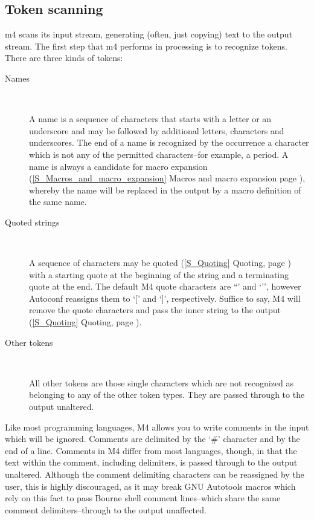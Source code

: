 \subsection{Token scanning}

m4 scans its input stream, generating (often, just copying) text to the output stream. The first step that m4 performs in processing is to recognize tokens. There are three kinds of tokens:

\begin{description}
\item[Names]
\

    A name is a sequence of characters that starts with a letter or an underscore and may be followed by additional letters, characters and underscores. The end of a name is recognized by the occurrence a character which is not any of the permitted characters--for example, a period. A name is always a candidate for macro expansion (\ref{S_Macros_and_macro_expansion} Macros and macro expansion
page \pageref{S_Macros_and_macro_expansion}), whereby the name will be replaced in the output by a macro definition of the same name.

\item[Quoted strings]
\

A sequence of characters may be quoted
(\ref{S_Quoting} Quoting, page \pageref{S_Quoting}) with a starting quote at 
the beginning of the string 
and a terminating quote at the end. The default M4 quote characters 
are ``' and `'', however Autoconf reassigns them to `[' and `]', respectively.
Suffice to say, M4 will remove the quote characters and pass the inner string 
to the output (\ref{S_Quoting} Quoting, page \pageref{S_Quoting}).

\item[Other tokens]
\

    All other tokens are those single characters which are not recognized as belonging to any of the other token types. They are passed through to the output unaltered.
\end{description}

Like most programming languages, M4 allows you to write comments in the 
input which will be ignored. Comments are delimited by the `\#' character and by the end of a line. Comments in M4 differ from most languages, though, in that the text within the comment, including delimiters, is passed through to the output unaltered. Although the comment delimiting characters can be reassigned by the user, this is highly discouraged, as it may break GNU Autotools macros which rely on this fact to pass Bourne shell comment lines--which share the same comment delimiters--through to the output unaffected. 

